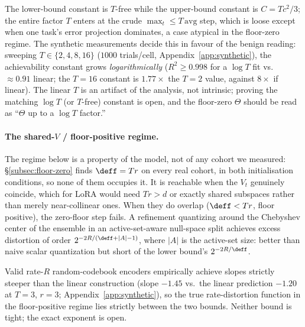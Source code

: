 \begin{remark}
\label{rem:tgap}
The lower-bound constant is $T$-free while the upper-bound constant is
$C = Tc^2/3$; the entire factor $T$ enters at the crude
$\max_t \leq T\,\mathrm{avg}$ step, which is loose except when one
task's error projection dominates, a case atypical in the floor-zero
regime. The synthetic measurements decide this in favour of the benign
reading: sweeping $T \in \{2,4,8,16\}$ ($1000$ trials/cell,
Appendix~\ref{app:synthetic}), the achievability constant grows
\emph{logarithmically} ($R^2 \geq 0.998$ for a $\log T$ fit vs.\
$\approx 0.91$ linear; the $T{=}16$ constant is $1.77\times$ the
$T{=}2$ value, against $8\times$ if linear). The linear $T$ is an
artifact of the analysis, not intrinsic; proving the matching $\log T$
(or $T$-free) constant is open, and the floor-zero $\Theta$ should be
read as ``$\Theta$ up to a $\log T$ factor.''
\end{remark}

\paragraph{The shared-$V$ / floor-positive regime.}\label{subsec:sharedv}
The regime below is a property of the model, not of any cohort we
measured: \S\ref{subsec:floor-zero} finds $\deff = Tr$ on every real
cohort, in both initialisation conditions, so none of them occupies it.
It is reachable when the $V_t$ genuinely coincide, which for LoRA would
need $Tr > d$ or exactly shared subspaces rather than merely
near-collinear ones. When they do overlap ($\deff < Tr$, floor positive),
the zero-floor step fails. A refinement quantizing around the Chebyshev center of the
ensemble in an active-set-aware null-space split achieves excess
distortion of order $2^{-2R/(\deff + |A| - 1)}$, where $|A|$ is the
active-set size: better than naive scalar quantization but short of
the lower bound's $2^{-2R/\deff}$.

\begin{remark}\label{rem:sharedv-gap}
Valid rate-$R$ random-codebook encoders empirically achieve slopes
strictly steeper than the linear construction (slope $-1.45$ vs.\ the
linear prediction $-1.20$ at $T = 3$, $r = 3$;
Appendix~\ref{app:synthetic}), so the true rate-distortion function in
the floor-positive regime lies strictly between the two bounds. Neither
bound is tight; the exact exponent is open.
\end{remark}

